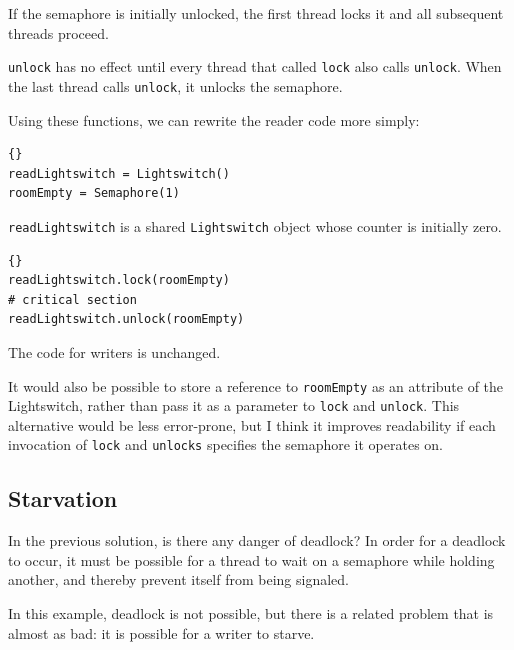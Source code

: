 \documentclass{book}
\begin{document}
If the semaphore is initially unlocked, the first thread locks it
and all subsequent threads proceed.

{\tt unlock} has no effect until every thread that called {\tt lock}
also calls {\tt unlock}.  When the last thread calls {\tt unlock}, it
unlocks the semaphore.

\newpage
Using these functions, we can rewrite the reader code
more simply:

\begin{latin}
\begin{latin}
\begin{lstlisting}[title={Readers-writers initialization}]{}
readLightswitch = Lightswitch()
roomEmpty = Semaphore(1)
\end{lstlisting}
\end{latin}
\end{latin}

{\tt readLightswitch} is a shared {\tt Lightswitch} object whose counter
is initially zero.

\begin{latin}
\begin{latin}
\begin{lstlisting}[title={Readers-writers solution (reader)}]{}
readLightswitch.lock(roomEmpty)
# critical section
readLightswitch.unlock(roomEmpty)
\end{lstlisting}
\end{latin}
\end{latin}

The code for writers is unchanged.

It would also be possible to store a reference to {\tt roomEmpty}
as an attribute of the Lightswitch, rather than pass it as a parameter
to {\tt lock} and {\tt unlock}.  This alternative would be less
error-prone, but I think it improves readability if each invocation
of {\tt lock} and {\tt unlocks} specifies the semaphore it operates on.

\subsection{Starvation}

In the previous solution, is there any danger of deadlock?
In order for a deadlock to occur, it must be possible for a
thread to wait on a semaphore while holding another, and thereby
prevent itself from being signaled.

In this example, deadlock is not possible, but there is a related
problem that is almost as bad: it is possible for a writer to
starve.
\end{document}
